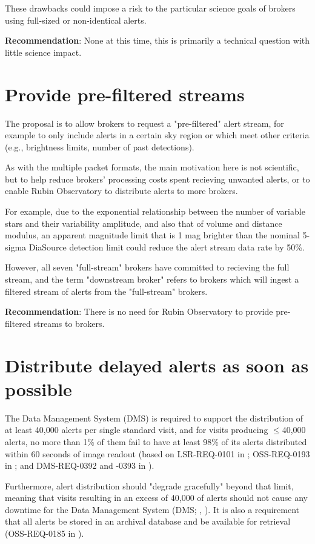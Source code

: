 \documentclass[DM,authoryear,toc]{lsstdoc}
\begin{document}
These drawbacks could impose a risk to the particular science goals of brokers using full-sized or non-identical alerts.

\textbf{Recommendation}: None at this time, this is primarily a technical question with little science impact.


\section{Provide pre-filtered streams}\label{sec:prefilter}

The proposal is to allow brokers to request a "pre-filtered" alert stream, for example to only include alerts in a certain sky region or which meet other criteria (e.g., brightness limits, number of past detections).

As with the multiple packet formats, the main motivation here is not scientific, but to help reduce brokers' processing costs spent recieving unwanted alerts, or to enable Rubin Observatory to distribute alerts to more brokers.

For example, due to the exponential relationship between the number of variable stars and their variability amplitude, and also that of volume and distance modulus, an apparent magnitude limit that is 1 mag brighter than the nominal 5-sigma DiaSource detection limit could reduce the alert stream data rate by 50\%.

However, all seven "full-stream" brokers have committed to recieving the full stream, and the term "downstream broker" refers to brokers which will ingest a filtered stream of alerts from the "full-stream" brokers.

\textbf{Recommendation}: There is no need for Rubin Observatory to provide pre-filtered streams to brokers.


\section{Distribute delayed alerts as soon as possible}\label{sec:delayed}

The Data Management System (DMS) is required to support the distribution of at least 40,000 alerts per single standard visit, and for visits producing $\leq$40,000 alerts, no more than 1\% of them fail to have at least 98\% of its alerts distributed within 60 seconds of image readout (based on LSR-REQ-0101 in ; OSS-REQ-0193 in ; and DMS-REQ-0392 and -0393 in ).

Furthermore, alert distribution should "degrade gracefully" beyond that limit, meaning that visits resulting in an excess of 40,000 of alerts should not cause any downtime for the Data Management System (DMS; , ).
It is also a requirement that all alerts be stored in an archival database and be available for retrieval (OSS-REQ-0185 in ).
\end{document}
